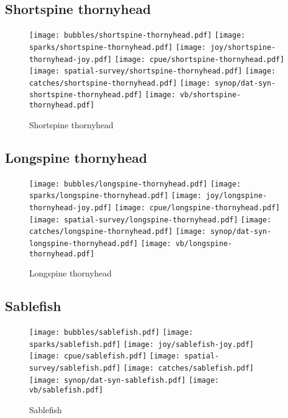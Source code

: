 \subsection*{Shortspine thornyhead}

\begin{figure}[htbp]
\centering
\texttt{[image: bubbles/shortspine-thornyhead.pdf]}
\texttt{[image: sparks/shortspine-thornyhead.pdf]}
\texttt{[image: joy/shortspine-thornyhead-joy.pdf]}
\texttt{[image: cpue/shortspine-thornyhead.pdf]}
\texttt{[image: spatial-survey/shortspine-thornyhead.pdf]}
\texttt{[image: catches/shortspine-thornyhead.pdf]}
\texttt{[image: synop/dat-syn-shortspine-thornyhead.pdf]}
\texttt{[image: vb/shortspine-thornyhead.pdf]}
\caption{Shortspine thornyhead}
\end{figure}
\clearpage
\subsection*{Longspine thornyhead}

\begin{figure}[htbp]
\centering
\texttt{[image: bubbles/longspine-thornyhead.pdf]}
\texttt{[image: sparks/longspine-thornyhead.pdf]}
\texttt{[image: joy/longspine-thornyhead-joy.pdf]}
\texttt{[image: cpue/longspine-thornyhead.pdf]}
\texttt{[image: spatial-survey/longspine-thornyhead.pdf]}
\texttt{[image: catches/longspine-thornyhead.pdf]}
\texttt{[image: synop/dat-syn-longspine-thornyhead.pdf]}
\texttt{[image: vb/longspine-thornyhead.pdf]}
\caption{Longspine thornyhead}
\end{figure}
\clearpage
\subsection*{Sablefish}

\begin{figure}[htbp]
\centering
\texttt{[image: bubbles/sablefish.pdf]}
\texttt{[image: sparks/sablefish.pdf]}
\texttt{[image: joy/sablefish-joy.pdf]}
\texttt{[image: cpue/sablefish.pdf]}
\texttt{[image: spatial-survey/sablefish.pdf]}
\texttt{[image: catches/sablefish.pdf]}
\texttt{[image: synop/dat-syn-sablefish.pdf]}
\texttt{[image: vb/sablefish.pdf]}
\caption{Sablefish}
\end{figure}
\clearpage

